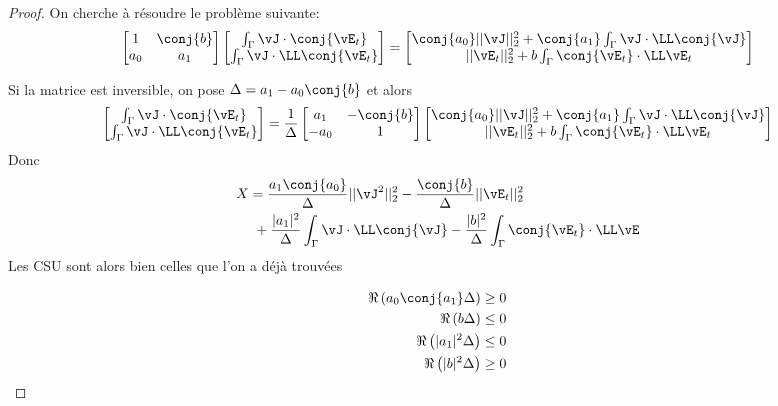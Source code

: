       \begin{proof}
        On cherche à résoudre le problème suivante:
        \[
          \begin{bmatrix}
            1 & \conj{b} \\
            a_0 & a_1
          \end{bmatrix}
          \begin{bmatrix}
            \int_\Gamma \vJ \cdot \conj{\vE_t} \\
            \int_\Gamma \vJ\cdot \LL\conj{\vE_t}
          \end{bmatrix}
          =
          \begin{bmatrix}
            \conj{a_0}||\vJ||_2^2 + \conj{a_1}\int_\Gamma \vJ \cdot \LL\conj{\vJ} \\
            ||\vE_t||_2^2 + b\int_\Gamma \conj{\vE_t} \cdot \LL\vE_t
          \end{bmatrix}
        \]

        Si la matrice est inversible, on pose \(\Delta = a_1 - a_0\conj{b}\) et alors
        \[
        \begin{bmatrix}
          \int_\Gamma \vJ \cdot \conj{\vE_t} \\
          \int_\Gamma \vJ\cdot \LL\conj{\vE_t}
        \end{bmatrix}
        =\frac{1}{\Delta}
        \begin{bmatrix}
          a_1 & -\conj{b} \\
          -a_0 & 1
        \end{bmatrix}
        \begin{bmatrix}
          \conj{a_0}||\vJ||_2^2 + \conj{a_1}\int_\Gamma \vJ \cdot \LL\conj{\vJ} \\
          ||\vE_t||_2^2 + b\int_\Gamma \conj{\vE_t} \cdot \LL\vE_t
        \end{bmatrix}
        \]
        Donc
        \begin{align*}
          X &=  \frac{a_1\conj{a_0}}{\Delta}||\vJ^2||_2^2 - \frac{\conj{b}}{\Delta}||\vE_t||_2^2 \\
          &~+\frac{|a_1|^2}{\Delta}\int_\Gamma\vJ\cdot \LL \conj{\vJ} - \frac{|b|^2}{\Delta}\int_\Gamma\conj{\vE_t}\cdot \LL\vE
        \end{align*}
        Les CSU sont alors bien celles que l'on a déjà trouvées

          \begin{align}
          \Re\left(a_0\conj{a_1}\Delta\right) &\ge 0\\
          \Re\left(b\Delta\right) &\le 0\\
          \Re\left(|a_1|^2\Delta\right) &\le 0\\
          \Re\left(|b|^2\Delta\right) &\ge 0
        \end{align}


\end{proof}
